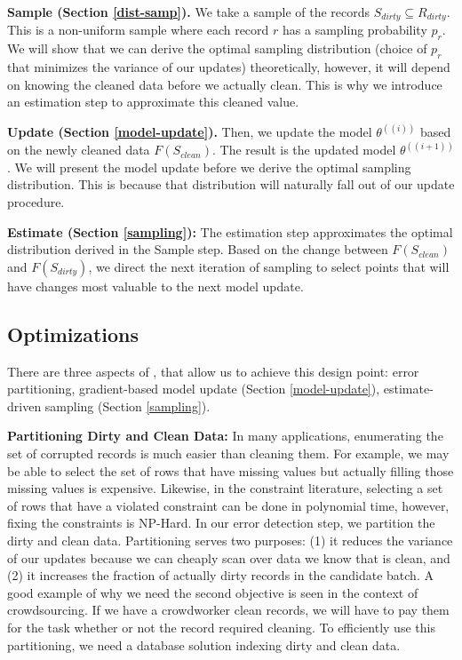 \vspace{0.5em}

\noindent\textbf{Sample (Section \ref{dist-samp}). } We take a sample of the records $S_{dirty} \subseteq R_{dirty}$. This is a non-uniform sample where each record $r$ has a sampling probability $p_r$.
We will show that we can derive the optimal sampling distribution (choice of $p_r$ that minimizes the variance of our updates) theoretically, however, it will depend on knowing the cleaned data before we actually clean. This is why we introduce an estimation step to approximate this cleaned value.

\vspace{0.5em}

\noindent\textbf{Update (Section \ref{model-update}). } Then, we update the model $\theta^({(i)})$ based on the newly cleaned data $F(S_{clean})$. The result is the updated model $\theta^({(i+1)})$. We will present the model update before we derive the optimal sampling distribution.
This is because that distribution will naturally fall out of our update procedure.

\vspace{0.5em}

\noindent\textbf{Estimate (Section \ref{sampling}): } The estimation step approximates the optimal distribution derived in the Sample step. Based on the change between $F(S_{clean})$ and $F(S_{dirty})$, we direct the next iteration of sampling to select points that will have changes most valuable to the next model update.

\iffalse
\subsection{Optimizations}
There are three aspects of \sys, that allow us to achieve this design point: error partitioning, gradient-based model update (Section \ref{model-update}), estimate-driven sampling (Section \ref{sampling}).

\vspace{0.5em}

\noindent\textbf{Partitioning Dirty and Clean Data: } In many applications, enumerating the set of corrupted records is much easier than cleaning them. For example, we may be able to select the set of rows that have missing values but actually filling those missing values is expensive. Likewise, in the constraint literature, selecting a set of rows that have a violated constraint can be done in polynomial time, however, fixing the constraints is NP-Hard.
In our error detection step, we partition the dirty and clean data.
Partitioning serves two purposes: (1) it reduces the variance of our updates because we can cheaply scan over data we know that is clean, and (2) it increases the fraction of actually dirty records in the candidate batch.
A good example of why we need the second objective is seen in the context of crowdsourcing.
If we have a crowdworker clean records, we will have to pay them for the task whether or not the record required cleaning.
To efficiently use this partitioning, we need a database solution indexing dirty and clean data.

